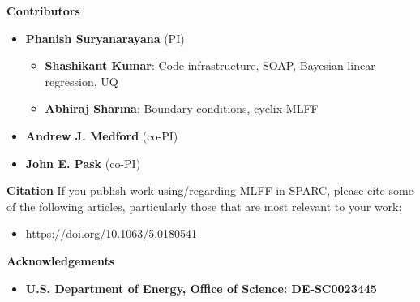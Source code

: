 

\begin{frame}[allowframebreaks]{\textbf{Contributors}} \label{Contributors}

	\begin{itemize}
	\item \textbf{Phanish Suryanarayana} (PI)
	\begin{itemize}
 	    \item \textbf{Shashikant Kumar}: Code infrastructure, SOAP, Bayesian linear regression, UQ \\    
 	    \item \textbf{Abhiraj Sharma}: Boundary conditions, cyclix MLFF \\  
 	\end{itemize}
  \item \textbf{Andrew J. Medford} (co-PI)
  \item \textbf{John E. Pask} (co-PI)

 	\end{itemize}
  
\end{frame}


\begin{frame}[allowframebreaks]{\textbf{Citation}} \label{Citation}
If you publish work using/regarding MLFF in SPARC, please cite some of the following articles, particularly those that are most relevant to your work:
\begin{itemize}
    \item \url{https://doi.org/10.1063/5.0180541}

\end{itemize}
\end{frame}


\begin{frame}[allowframebreaks]{\textbf{Acknowledgements}} \label{Acknowledgements}
\begin{itemize}
    \item \textbf{U.S. Department of Energy, Office of Science: DE-SC0023445 
        } \\
\end{itemize}
\end{frame}


